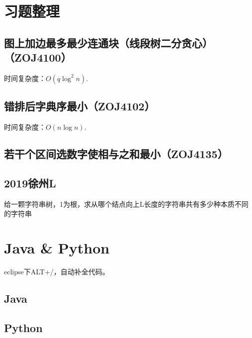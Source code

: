 \documentclass[landscape,twocolumn,a4paper]{article}
\begin{document}
\section{习题整理}
\subsection{图上加边最多最少连通块（线段树二分贪心）（ZOJ4100）}
时间复杂度：$O(q \log ^ {2} n)$.

\subsection{错排后字典序最小（ZOJ4102）}
时间复杂度：$O(n \log n)$.

\subsection{若干个区间选数字使相与之和最小（ZOJ4135）}

\subsection{2019徐州L}
给一颗字符串树，1为根，求从哪个结点向上L长度的字符串共有多少种本质不同的字符串


\section{Java \& Python}
eclipse下ALT+/，自动补全代码。
\subsection{Java}


\subsection{Python}

\end{document}
